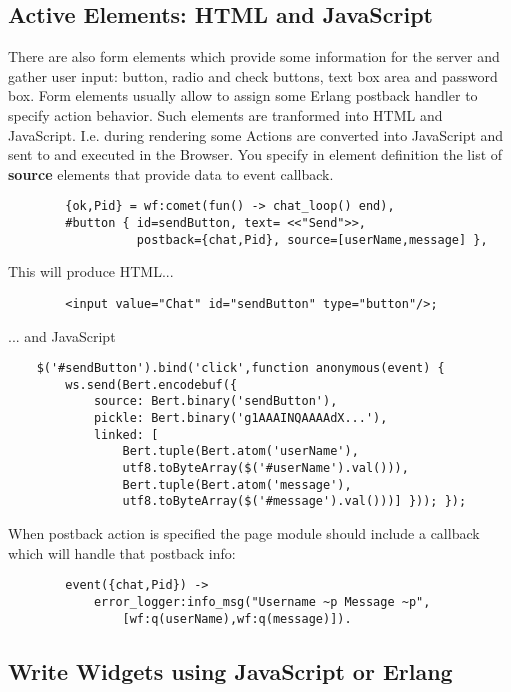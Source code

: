 \subsection{Active Elements: HTML and JavaScript}
There are also form elements which provide some information for the server
and gather user input:  button, radio and check buttons, text box area and password box.
Form elements usually allow to assign some Erlang postback handler to specify action behavior.
Such elements are tranformed into HTML and JavaScript. I.e. during rendering some
Actions are converted into JavaScript and sent to and executed in the Browser.
You specify in element definition the list of {\bf source} elements that provide data to event callback.

\vspace{1\baselineskip}
\begin{lstlisting}
        {ok,Pid} = wf:comet(fun() -> chat_loop() end),
        #button { id=sendButton, text= <<"Send">>, 
                  postback={chat,Pid}, source=[userName,message] },
\end{lstlisting}
\vspace{1\baselineskip}

This will produce HTML...

\vspace{1\baselineskip}
\begin{lstlisting}
        <input value="Chat" id="sendButton" type="button"/>;
\end{lstlisting}
\vspace{1\baselineskip}

... and JavaScript

\vspace{1\baselineskip}
\begin{lstlisting}
    $('#sendButton').bind('click',function anonymous(event) { 
        ws.send(Bert.encodebuf({
            source: Bert.binary('sendButton'), 
            pickle: Bert.binary('g1AAAINQAAAAdX...'),
            linked: [
                Bert.tuple(Bert.atom('userName'),
                utf8.toByteArray($('#userName').val())),
                Bert.tuple(Bert.atom('message'),
                utf8.toByteArray($('#message').val()))] })); });
\end{lstlisting}
\vspace{1\baselineskip}

When postback action is specified the page module should include a callback which will handle that postback info:

\vspace{1\baselineskip}
\begin{lstlisting}
        event({chat,Pid}) ->
            error_logger:info_msg("Username ~p Message ~p",
                [wf:q(userName),wf:q(message)]).
\end{lstlisting}
\vspace{1\baselineskip}


\subsection{Write Widgets using JavaScript or Erlang}
